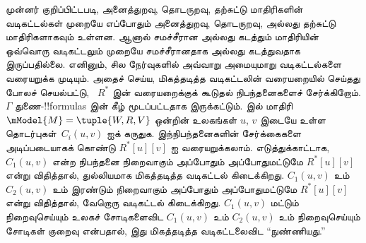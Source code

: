 \documentclass[../../../include/open-logic-section]{subfiles}
\begin{document}


முன்னர் குறிப்பிட்டபடி, அனைத்துறவு, தொடருறவு, தற்சுட்டு மாதிரிகளின்
வடிகட்டல்கள் முறையே எப்போதும் அனைத்துறவு, தொடருறவு, அல்லது தற்சுட்டு
மாதிரிகளாகவும் உள்ளன. ஆனால் சமச்சீரான அல்லது கடத்தும் மாதிரியின் ஒவ்வொரு
வடிகட்டலும் முறையே சமச்சீரானதாக அல்லது கடத்துவதாக இருப்பதில்லை. எனினும்,
சில நேர்வுகளில் அவ்வாறு அமையுமாறு வடிகட்டல்களை வரையறுக்க முடியும். அதைச்
செய்ய, மிகத்தடித்த வடிகட்டலின் வரையறையில் செய்தது போலச் செயல்பட்டு,
~$R^*$ இன் வரையறைக்குக் கூடுதல் நிபந்தனைகளைச் சேர்க்கிறோம். $\Gamma$
துணை-!!{formula}s இன் கீழ் மூடப்பட்டதாக இருக்கட்டும்.
 இல் மாதிரி
$\mModel{M} =\tuple{W, R, V}$ ஒன்றின் உலகங்கள் $u$, $v$ இடையே உள்ள
தொடர்புகள்~$C_i(u,v)$ ஐக் கருதுக. இந்நிபந்தனைகளின் சேர்க்கைகளை
அடிப்படையாகக் கொண்டு $R^*[u][v]$ ஐ வரையறுக்கலாம். எடுத்துக்காட்டாக,
$C_1(u,v)$ என்ற நிபந்தனை நிறைவாகும் அப்போதும் அப்போதுமட்டுமே
$R^*[u][v]$ என்று விதித்தால், துல்லியமாக மிகத்தடித்த வடிகட்டல் கிடைக்கிறது.
$C_1(u,v)$ உம் $C_2(u, v)$ உம் இரண்டும் நிறைவாகும் அப்போதும்
அப்போதுமட்டுமே $R^*[u][v]$ என்று விதித்தால், வேறொரு வடிகட்டல் கிடைக்கிறது.
$C_1(u,v)$ மட்டும் நிறைவுசெய்யும் உலகச் சோடிகளைவிட $C_1(u,v)$ உம்
$C_2(u,v)$ உம் நிறைவுசெய்யும் சோடிகள் குறைவு என்பதால், இது மிகத்தடித்த
வடிகட்டலைவிட “நுண்ணியது.”
\end{document}
